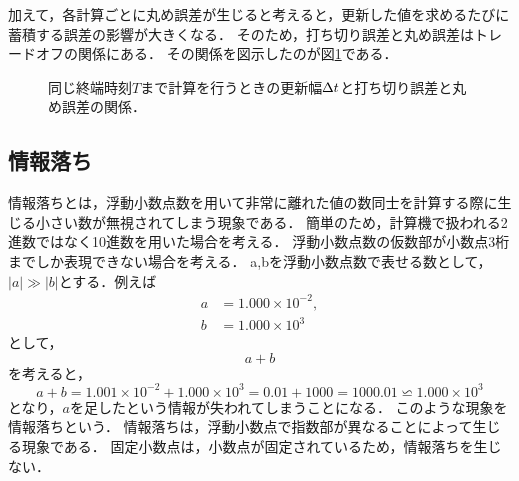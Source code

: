 加えて，各計算ごとに丸め誤差が生じると考えると，更新した値を求めるたびに蓄積する誤差の影響が大きくなる．
そのため，打ち切り誤差と丸め誤差はトレードオフの関係にある．
その関係を図示したのが図\ref{fig:error_tradingoff}である．
\begin{figure}[H]
    \centering
    \caption{同じ終端時刻$T$まで計算を行うときの更新幅$\Delta t$と打ち切り誤差と丸め誤差の関係．}
    \label{fig:error_tradingoff}
\end{figure}

\subsection{情報落ち}
情報落ちとは，浮動小数点数を用いて非常に離れた値の数同士を計算する際に生じる小さい数が無視されてしまう現象である．
簡単のため，計算機で扱われる2進数ではなく10進数を用いた場合を考える．
浮動小数点数の仮数部が小数点3桁までしか表現できない場合を考える．
a,bを浮動小数点数で表せる数として，$|a| \gg |b|$とする．例えば
\begin{align*}
    a &= 1.000 \times 10^{-2}, \\
    b &= 1.000 \times 10^{3}
\end{align*}
として，
\begin{equation*}
    a + b
\end{equation*}
を考えると，
\begin{equation*}
    a + b = 1.001 \times 10^{-2} + 1.000 \times 10^{3} = 0.01 + 1000 = 1000.01 \backsimeq 1.000 \times 10^{3}
\end{equation*}
となり，$a$を足したという情報が失われてしまうことになる．
このような現象を情報落ちという．
情報落ちは，浮動小数点で指数部が異なることによって生じる現象である．
固定小数点は，小数点が固定されているため，情報落ちを生じない．

